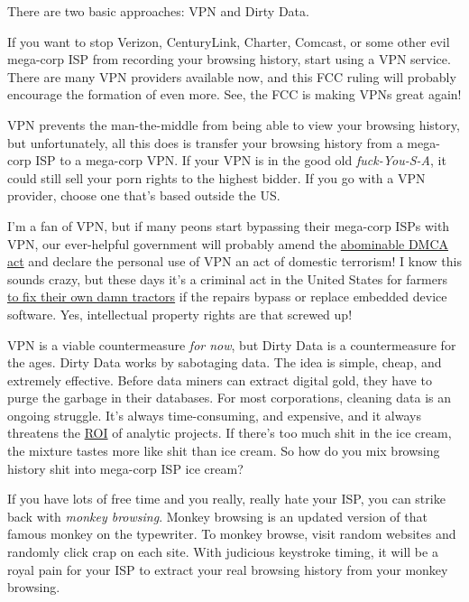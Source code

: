 There are two basic approaches: VPN and Dirty Data.

If you want to stop Verizon, CenturyLink, Charter, Comcast, or some other
evil mega-corp ISP from recording your browsing history, start using a
VPN service. There are many VPN providers available now, and this FCC
ruling will probably encourage the formation of even more. See, the FCC
is making VPNs great again!

VPN prevents the man-the-middle from being able to view your browsing
history, but unfortunately, all this does is transfer your browsing
history from a mega-corp ISP to a mega-corp VPN. If your VPN is in the
good old \emph{fuck-You-S-A}, it could still sell your porn rights to the
highest bidder. If you go with a VPN provider, choose one that's based
outside the US.

I'm a fan of VPN, but if many peons start bypassing their mega-corp ISPs
with VPN, our ever-helpful government will probably amend the
\href{https://en.wikipedia.org/wiki/Digital_Millennium_Copyright_Act}{abominable
DMCA act} and declare the personal use of VPN an act of domestic
terrorism! I know this sounds crazy, but these days it's a criminal act
in the United States for farmers
\href{http://modernfarmer.com/2016/07/right-to-repair/}{to fix their own
damn tractors} if the repairs bypass or replace embedded device
software. Yes, intellectual property rights are that screwed up!

VPN is a viable countermeasure \emph{for now}, but Dirty Data is a
countermeasure for the ages. Dirty Data works by sabotaging data. The
idea is simple, cheap, and extremely effective. Before data miners can
extract digital gold, they have to purge the garbage in their databases.
For most corporations, cleaning data is an ongoing struggle. It's always
time-consuming, and expensive, and it always threatens the
\href{http://www.investopedia.com/terms/r/returnoninvestment.asp}{ROI}
of analytic projects. If there's too much shit in the ice cream, the
mixture tastes more like shit than ice cream. So how do you mix browsing
history shit into mega-corp ISP ice cream?

If you have lots of free time and you really, really hate your ISP, you
can strike back with \emph{monkey browsing}. Monkey browsing is an
updated version of that famous monkey on the typewriter. To monkey
browse, visit random websites and randomly click crap on each site. With
judicious keystroke timing, it will be a royal pain for your ISP to
extract your real browsing history from your monkey browsing.

